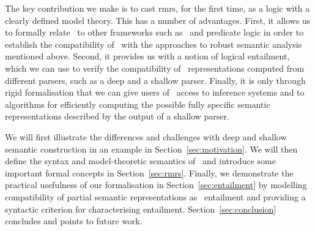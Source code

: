 The key contribution we make is to cast {\sc rmrs}, for the first
time, as a logic with a clearly defined model theory.  This has a
number of advantages.  First, it allows us to formally relate \rmrs\ to
other frameworks such as \mrs\ and predicate logic in order to
establish the compatibility of \rmrs\ with the approaches to robust
semantic analysis mentioned above.  Second, it provides us with a
notion of logical entailment, which we can use to verify the
compatibility of \rmrs\ representations computed from different
parsers, such as a deep and a shallow parser.  Finally, it is only
through rigid formalisation that we can give users of \rmrs\ access to
inference systems and to algorithms for efficiently computing the
possible fully specific semantic representations described by the \rmrs
output of a shallow parser.

We will first illustrate the differences and challenges with deep and
shallow semantic construction in an example in
Section~\ref{sec:motivation}.  We will then define the syntax and
model-theoretic semantics of \rmrs\ and introduce some important
formal concepts in Section~\ref{sec:rmrs}.  Finally, we demonstrate
the practical usefulness of our formalisation in
Section~\ref{sec:entailment} by modelling compatibility of
partial semantic representations as \rmrs\ entailment and providing a
syntactic criterion for characterising entailment.
Section~\ref{sec:conclusion} concludes and points to future work.


